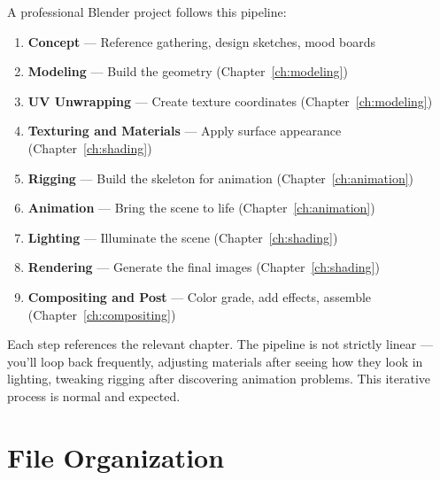 \documentclass[11pt,letterpaper,twoside,openright]{book}
\begin{document}
A professional Blender project follows this pipeline:

\begin{enumerate}[leftmargin=2em]
  \item \textbf{Concept} --- Reference gathering, design sketches, mood boards
  \item \textbf{Modeling} --- Build the geometry (Chapter~\ref{ch:modeling})
  \item \textbf{UV Unwrapping} --- Create texture coordinates (Chapter~\ref{ch:modeling})
  \item \textbf{Texturing and Materials} --- Apply surface appearance (Chapter~\ref{ch:shading})
  \item \textbf{Rigging} --- Build the skeleton for animation (Chapter~\ref{ch:animation})
  \item \textbf{Animation} --- Bring the scene to life (Chapter~\ref{ch:animation})
  \item \textbf{Lighting} --- Illuminate the scene (Chapter~\ref{ch:shading})
  \item \textbf{Rendering} --- Generate the final images (Chapter~\ref{ch:shading})
  \item \textbf{Compositing and Post} --- Color grade, add effects, assemble (Chapter~\ref{ch:compositing})
\end{enumerate}

Each step references the relevant chapter. The pipeline is not strictly linear --- you'll loop back frequently, adjusting materials after seeing how they look in lighting, tweaking rigging after discovering animation problems. This iterative process is normal and expected.

\section{File Organization}
\end{document}
